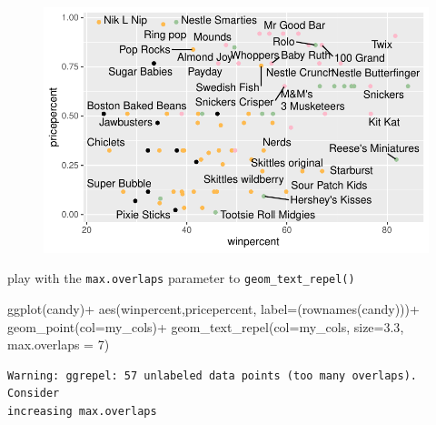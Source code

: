 \documentclass[
  letterpaper,
  DIV=11,
  numbers=noendperiod]{scrartcl}
\newenvironment{Shaded}{\begin{snugshade}}{\end{snugshade}}
\newcommand{\AttributeTok}[1]{\textcolor[rgb]{0.40,0.45,0.13}{#1}}
\newcommand{\DecValTok}[1]{\textcolor[rgb]{0.68,0.00,0.00}{#1}}
\newcommand{\FloatTok}[1]{\textcolor[rgb]{0.68,0.00,0.00}{#1}}
\newcommand{\FunctionTok}[1]{\textcolor[rgb]{0.28,0.35,0.67}{#1}}
\newcommand{\NormalTok}[1]{\textcolor[rgb]{0.00,0.23,0.31}{#1}}
\newcommand{\SpecialCharTok}[1]{\textcolor[rgb]{0.37,0.37,0.37}{#1}}
\begin{document}
\begin{figure}[H]

{\centering \includegraphics{class09_files/figure-pdf/unnamed-chunk-23-1.pdf}

}

\end{figure}

play with the \texttt{max.overlaps} parameter to
\texttt{geom\_text\_repel()}

\begin{Shaded}
\begin{Highlighting}[]
\FunctionTok{ggplot}\NormalTok{(candy)}\SpecialCharTok{+}
  \FunctionTok{aes}\NormalTok{(winpercent,pricepercent, }\AttributeTok{label=}\NormalTok{(}\FunctionTok{rownames}\NormalTok{(candy)))}\SpecialCharTok{+}
  \FunctionTok{geom\_point}\NormalTok{(}\AttributeTok{col=}\NormalTok{my\_cols)}\SpecialCharTok{+}
  \FunctionTok{geom\_text\_repel}\NormalTok{(}\AttributeTok{col=}\NormalTok{my\_cols, }\AttributeTok{size=}\FloatTok{3.3}\NormalTok{, }\AttributeTok{max.overlaps =} \DecValTok{7}\NormalTok{)}
\end{Highlighting}
\end{Shaded}

\begin{verbatim}
Warning: ggrepel: 57 unlabeled data points (too many overlaps). Consider
increasing max.overlaps
\end{verbatim}
\end{document}

